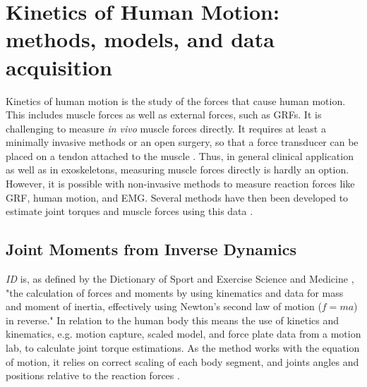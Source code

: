 \documentclass[../main.tex]{subfiles}
\begin{document}
\section{Kinetics of Human Motion: methods, models, and data acquisition}
\label{sec:A-MSModels}
Kinetics of human motion is the study of the forces that cause human motion. 
This includes muscle forces as well as external forces, such as \acp{GRF}.
It is challenging to measure \textit{in vivo} muscle forces directly.
It requires at least a minimally invasive methods or an open surgery, so that a force transducer can be placed on a tendon attached to the muscle \cite{Erdemir2007}. 
Thus, in general clinical application as well as in exoskeletons, measuring muscle forces directly is hardly an option.
However, it is possible with non-invasive methods to measure reaction forces like \ac{GRF}, human motion, and \ac{EMG}.
Several methods have then been developed to estimate joint torques and muscle forces using this data \cite{Erdemir2007}.

\subsection{Joint Moments from Inverse Dynamics}
\label{sec:A-Inverse-Dynamics}
\textit{\Acf{ID}} is, as defined by the Dictionary of Sport and Exercise Science and Medicine \cite{inversedynamics}, "the calculation of forces and moments by using kinematics and data for mass and moment of inertia, effectively using Newton's second law of motion ($f = ma$) in reverse."
In relation to the human body this means the use of kinetics and kinematics, e.g. motion capture, scaled model, and force plate data from a motion lab, to calculate joint torque estimations.
As the method works with the equation of motion, it relies on correct scaling of each body segment, and joints angles and positions relative to the reaction forces \cite{Erdemir2007, Buchanan2004}.
\end{document}
